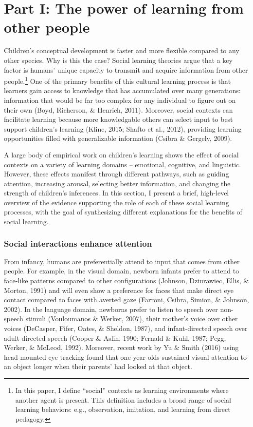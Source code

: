 \documentclass[a4paper,man,apacite,floatsintext]{apa6}
\begin{document}
\section{Part I: The power of learning from other
people}\label{part-i-the-power-of-learning-from-other-people}

Children's conceptual development is faster and more flexible compared
to any other species. Why is this the case? Social learning theories
argue that a key factor is humans' unique capacity to transmit and
acquire information from other people.\footnote{In this paper, I define
  ``social'' contexts as learning environments where another agent is
  present. This definition includes a broad range of social learning
  behaviors: e.g., observation, imitation, and learning from direct
  pedagogy.} One of the primary benefits of this cultural learning
process is that learners gain access to knowledge that has accumulated
over many generations: information that would be far too complex for any
individual to figure out on their own (Boyd, Richerson, \& Henrich,
2011). Moreover, social contexts can facilitate learning because more
knowledgable others can select input to best support children's learning
(Kline, 2015; Shafto et al., 2012), providing learning opportunities
filled with generalizable information (Csibra \& Gergely, 2009).

A large body of empirical work on children's learning shows the effect
of social contexts on a variety of learning domains -- emotional,
cognitive, and linguistic. However, these effects manifest through
different pathways, such as guiding attention, increasing arousal,
selecting better information, and changing the strength of children's
inferences. In this section, I present a brief, high-level overview of
the evidence supporting the role of each of these social learning
processes, with the goal of synthesizing different explanations for the
benefits of social learning.

\subsubsection{Social interactions enhance
attention}\label{social-interactions-enhance-attention}

From infancy, humans are preferentially attend to input that comes from
other people. For example, in the visual domain, newborn infants prefer
to attend to face-like patterns compared to other configurations
(Johnson, Dziurawiec, Ellis, \& Morton, 1991) and will even show a
preference for faces that make direct eye contact compared to faces with
averted gaze (Farroni, Csibra, Simion, \& Johnson, 2002). In the
language domain, newborns prefer to listen to speech over non-speech
stimuli (Vouloumanos \& Werker, 2007), their mother's voice over other
voices (DeCasper, Fifer, Oates, \& Sheldon, 1987), and infant-directed
speech over adult-directed speech (Cooper \& Aslin, 1990; Fernald \&
Kuhl, 1987; Pegg, Werker, \& McLeod, 1992). Moreover, recent work by Yu
\& Smith (2016) using head-mounted eye tracking found that one-year-olds
sustained visual attention to an object longer when their parents' had
looked at that object.
\end{document}
